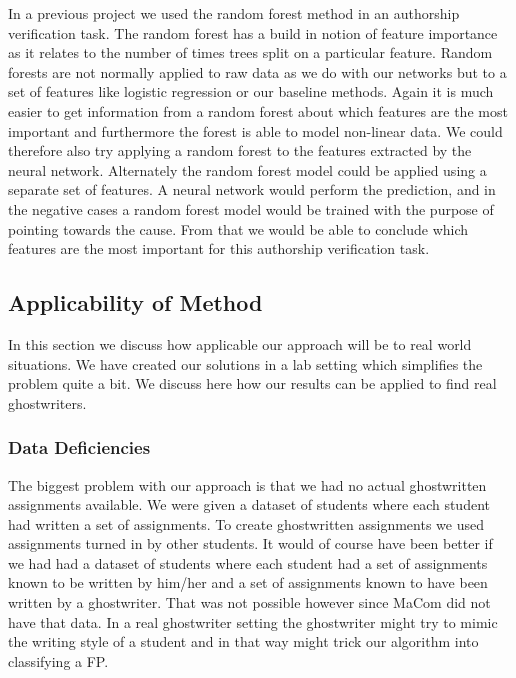 In a previous project \citep{US} we used the random forest method in an
authorship verification task. The random forest has a build in notion of feature
importance as it relates to the number of times trees split on a particular
feature. Random forests are not normally applied to raw data as we do with our
networks but to a set of features like logistic regression or our baseline
methods. Again it is much easier to get information from a random forest about
which features are the most important and furthermore the forest is able to
model non-linear data. We could therefore also try applying a random forest to
the features extracted by the neural network. Alternately the random forest
model could be applied using a separate set of features. A neural network would
perform the prediction, and in the negative cases a random forest model would
be trained with the purpose of pointing towards the cause. From that we would
be able to conclude which features are the most important for this authorship
verification task.


\subsection{Applicability of Method}\label{subsec:applicability_of_method}

In this section we discuss how applicable our approach will be to real
world situations. We have created our solutions in a lab setting which
simplifies the problem quite a bit. We discuss here how our results can be
applied to find real ghostwriters.


\subsubsection{Data Deficiencies}

The biggest problem with our approach is that we had no actual ghostwritten
assignments available. We were given a dataset of students where each student
had written a set of assignments. To create ghostwritten assignments we used
assignments turned in by other students. It would of course have been better if
we had had a dataset of students where each student had a set of assignments
known to be written by him/her and a set of assignments known to have been
written by a ghostwriter. That was not possible however since MaCom did not have
that data. In a real ghostwriter setting the ghostwriter might try to mimic
the writing style of a student and in that way might trick our algorithm into
classifying a \gls{FP}.

